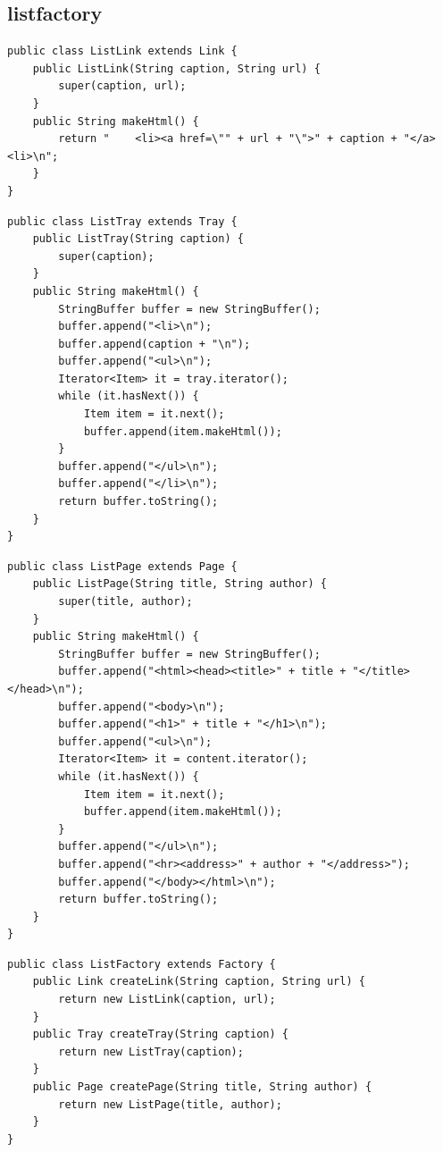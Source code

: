 \subsection{listfactory}
\begin{lstlisting}
public class ListLink extends Link {
	public ListLink(String caption, String url) {
		super(caption, url);
	}
	public String makeHtml() {
		return "    <li><a href=\"" + url + "\">" + caption + "</a><li>\n";
	}
}
\end{lstlisting}
\begin{lstlisting}
public class ListTray extends Tray {
	public ListTray(String caption) {
		super(caption);
	}
	public String makeHtml() {
		StringBuffer buffer = new StringBuffer();
		buffer.append("<li>\n");
		buffer.append(caption + "\n");
		buffer.append("<ul>\n");
		Iterator<Item> it = tray.iterator();
		while (it.hasNext()) {
			Item item = it.next();
			buffer.append(item.makeHtml());
		}
		buffer.append("</ul>\n");
		buffer.append("</li>\n");
		return buffer.toString();
	}
}
\end{lstlisting}
\begin{lstlisting}
public class ListPage extends Page {
	public ListPage(String title, String author) {
		super(title, author);
	}
	public String makeHtml() {
		StringBuffer buffer = new StringBuffer();
		buffer.append("<html><head><title>" + title + "</title></head>\n");
		buffer.append("<body>\n");
		buffer.append("<h1>" + title + "</h1>\n");
		buffer.append("<ul>\n");
		Iterator<Item> it = content.iterator();
		while (it.hasNext()) {
			Item item = it.next();
			buffer.append(item.makeHtml());
		}
		buffer.append("</ul>\n");
		buffer.append("<hr><address>" + author + "</address>");
		buffer.append("</body></html>\n");
		return buffer.toString();
	}
}
\end{lstlisting}
\begin{lstlisting}
public class ListFactory extends Factory {
	public Link createLink(String caption, String url) {
		return new ListLink(caption, url);
	}
	public Tray createTray(String caption) {
		return new ListTray(caption);
	}
	public Page createPage(String title, String author) {
		return new ListPage(title, author);
	}
}
\end{lstlisting}
